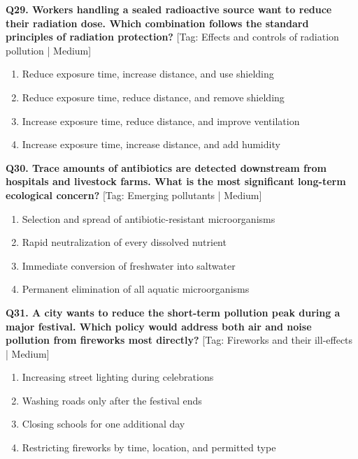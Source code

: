 \noindent\textbf{Q29. Workers handling a sealed radioactive source want to reduce their radiation dose. Which combination follows the standard principles of radiation protection?} \hfill [Tag: Effects and controls of radiation pollution | Medium]
\begin{enumerate}[label=(\alph*),topsep=2pt,itemsep=1pt,partopsep=0pt,parsep=0pt]
    \item {Reduce exposure time, increase distance, and use shielding}
    \item {Reduce exposure time, reduce distance, and remove shielding}
    \item {Increase exposure time, reduce distance, and improve ventilation}
    \item {Increase exposure time, increase distance, and add humidity}
\end{enumerate}
\vspace{2mm}

\noindent\textbf{Q30. Trace amounts of antibiotics are detected downstream from hospitals and livestock farms. What is the most significant long-term ecological concern?} \hfill [Tag: Emerging pollutants | Medium]
\begin{enumerate}[label=(\alph*),topsep=2pt,itemsep=1pt,partopsep=0pt,parsep=0pt]
    \item {Selection and spread of antibiotic-resistant microorganisms}
    \item {Rapid neutralization of every dissolved nutrient}
    \item {Immediate conversion of freshwater into saltwater}
    \item {Permanent elimination of all aquatic microorganisms}
\end{enumerate}
\vspace{2mm}

\noindent\textbf{Q31. A city wants to reduce the short-term pollution peak during a major festival. Which policy would address both air and noise pollution from fireworks most directly?} \hfill [Tag: Fireworks and their ill-effects | Medium]
\begin{enumerate}[label=(\alph*),topsep=2pt,itemsep=1pt,partopsep=0pt,parsep=0pt]
    \item {Increasing street lighting during celebrations}
    \item {Washing roads only after the festival ends}
    \item {Closing schools for one additional day}
    \item {Restricting fireworks by time, location, and permitted type}
\end{enumerate}
\vspace{2mm}

